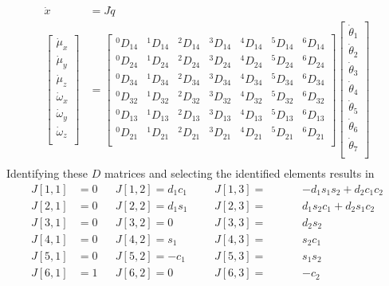 \documentclass{article}
\begin{document}
\begin{align*}
\dot{x} &= J \dot{q} \\
\left[\begin{matrix}
\dot{\mu}_x \\
\dot{\mu}_y \\
\dot{\mu}_z \\
\dot{\omega}_x \\
\dot{\omega}_y \\
\dot{\omega}_z \\
\end{matrix}\right]
&=
\left[\begin{matrix}
^0D_{14} & ^1D_{14} & ^2D_{14} & ^3D_{14} & ^4D_{14} & ^5D_{14} & ^6D_{14} \\
^0D_{24} & ^1D_{24} & ^2D_{24} & ^3D_{24} & ^4D_{24} & ^5D_{24} & ^6D_{24} \\
^0D_{34} & ^1D_{34} & ^2D_{34} & ^3D_{34} & ^4D_{34} & ^5D_{34} & ^6D_{34} \\
^0D_{32} & ^1D_{32} & ^2D_{32} & ^3D_{32} & ^4D_{32} & ^5D_{32} & ^6D_{32} \\
^0D_{13} & ^1D_{13} & ^2D_{13} & ^3D_{13} & ^4D_{13} & ^5D_{13} & ^6D_{13} \\
^0D_{21} & ^1D_{21} & ^2D_{21} & ^3D_{21} & ^4D_{21} & ^5D_{21} & ^6D_{21} \\
\end{matrix}\right]
\left[\begin{matrix}
\dot{\theta}_1 \\
\dot{\theta}_2 \\
\dot{\theta}_3 \\
\dot{\theta}_4 \\
\dot{\theta}_5 \\
\dot{\theta}_6 \\
\dot{\theta}_7 \\
\end{matrix}\right] \\
\end{align*}
Identifying these $D$ matrices and selecting the identified elements results in
\begin{align*}
J[1,1] &= 0 && J[1,2] = d_{1} c_{1}  &&& J[1,3] = &&&& - d_{1} s_{1} s_{2} + d_{2} c_{1} c_{2} \\
J[2,1] &= 0 && J[2,2] = d_{1} s_{1}  &&& J[2,3] = &&&& d_{1} s_{2} c_{1} + d_{2} s_{1} c_{2} \\
J[3,1] &= 0 && J[3,2] = 0            &&& J[3,3] = &&&& d_{2} s_{2} \\
J[4,1] &= 0 && J[4,2] = s_{1}        &&& J[4,3] = &&&& s_{2} c_{1} \\
J[5,1] &= 0 && J[5,2] = - c_{1}      &&& J[5,3] = &&&& s_{1} s_{2} \\
J[6,1] &= 1 && J[6,2] = 0            &&& J[6,3] = &&&& - c_{2} \\
\end{align*}
\end{document}
